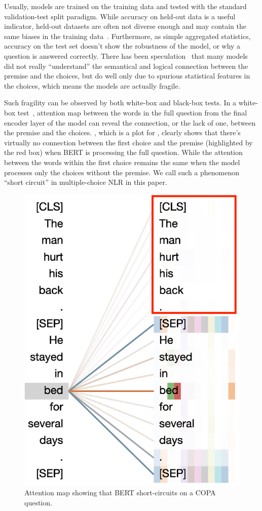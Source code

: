 Usually, models are trained on the training data and tested with the standard 
validation-test split paradigm.  While accuracy on held-out data is a useful
indicator, held-out datasets are often not diverse enough
and may contain the same biases in the training
data~\cite{mccoy2019right}. Furthermore, as simple aggregated statistics, 
accuracy on the test set doesn't show the robustness of the model,
or why a question is answered correctly. 
There has been speculation~\cite{endingonly1,zellers2018swag} that many models 
did not really ``understand'' the semantical and logical connection between
the premise and the choices, 
but do well only due to spurious statistical features in the choices, 
which means the models are actually fragile.

Such fragility can be observed by 
both white-box and 
black-box tests.
In a white-box test~\cite{vig-2019-multiscale}, attention map between the words in the full question 
from the final encoder layer of the model can reveal the
connection, or the lack of one, between the premise and the choices. 
, which is a plot for ,
clearly shows that there's virtually no connection between the first choice
and the premise (highlighted by the red box) when BERT is processing
the full question. While the attention between the words within the
first choice remains the same when the model processes only the choices
without the premise. 
We call such a phenomenon ``short circuit'' in multiple-choice 
NLR in this paper. 

\begin{figure}[th!]
\centering
\includegraphics[width=0.5\columnwidth]{figure/end_related.eps}
\caption{Attention map showing that BERT short-circuits on a COPA question.}
\label{fig:att-goodex}
\end{figure}


